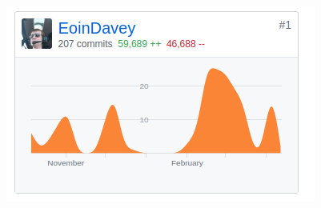 \begin{center}
    \includegraphics[scale=0.8]{app4assets/github-trys}
    \label{screenshot:github-trys}
\end{center}
